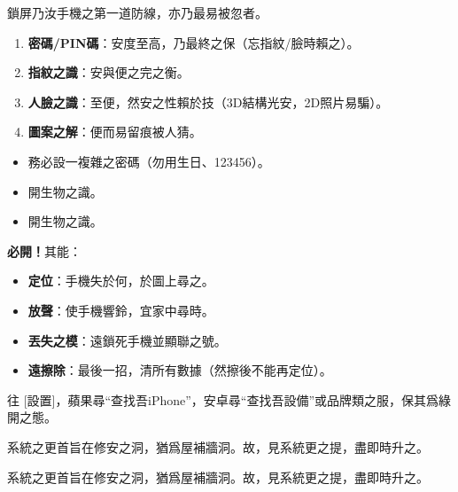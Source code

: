 


鎖屏乃汝手機之第一道防線，亦乃最易被忽者。


\begin{enumerate}
  \item \textbf{密碼/PIN碼}：安度至高，乃最終之保（忘指紋/臉時賴之）。
  \item \textbf{指紋之識}：安與便之完之衡。
  \item \textbf{人臉之識}：至便，然安之性賴於技（3D結構光安，2D照片易騙）。
  \item \textbf{圖案之解}：便而易留痕被人猜。
\end{enumerate}


\begin{itemize}
  \item 務必設一複雜之密碼（勿用生日、123456）。
  \item 開生物之識。
  \item 開生物之識。
\end{itemize}


\textbf{必開！}其能：

\begin{itemize}
  \item \textbf{定位}：手機失於何，於圖上尋之。
  \item \textbf{放聲}：使手機響鈴，宜家中尋時。
  \item \textbf{丟失之模}：遠鎖死手機並顯聯之號。
  \item \textbf{遠擦除}：最後一招，清所有數據（然擦後不能再定位）。
\end{itemize}

往 [設置]，蘋果尋“查找吾iPhone”，安卓尋“查找吾設備”或品牌類之服，保其爲綠開之態。


系統之更首旨在修安之洞，猶爲屋補牆洞。故，見系統更之提，盡即時升之。

系統之更首旨在修安之洞，猶爲屋補牆洞。故，見系統更之提，盡即時升之。


